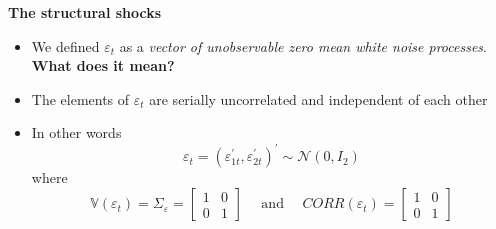 \begin{frame}
{\textbf{The structural shocks}}\bigskip

\begin{itemize}
\item We defined $\varepsilon _{t}$ as a \emph{vector of unobservable zero
mean white noise processes}. \textbf{What does it mean?} \bigskip \medskip%
\pause

\item The elements of $\varepsilon _{t}$ are serially uncorrelated and
independent of each other\bigskip \medskip\medskip

\item In other words 
\begin{equation*}
\varepsilon _{t}=(\varepsilon _{1t}^{\prime },\varepsilon _{2t}^{\prime
})^{\prime }\sim \mathcal{N}(0,I_{2})
\end{equation*}%
\medskip where\medskip 
\begin{equation*}
\mathbb{V}(\varepsilon _{t})=\Sigma _{\varepsilon }=\left[ 
\begin{array}{cc}
1 & 0 \\ 
0 & 1%
\end{array}%
\right] \ \ \ \ \ \ \text{and}\ \ \ \ \ \ CORR(\varepsilon _{t})=\left[ 
\begin{array}{cc}
1 & 0 \\ 
0 & 1%
\end{array}%
\right]
\end{equation*}
\end{itemize}
\end{frame}


